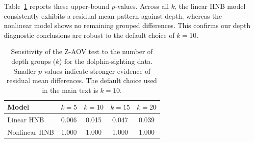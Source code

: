 \documentclass[
  12pt]{article}
\theoremstyle{plain}
\theoremstyle{definition}
\theoremstyle{remark}
\begin{document}
Table~\ref{tab:binning_sensitivity_pbound} reports these upper-bound $p$-values. Across all $k$, the linear HNB model consistently exhibits a residual mean pattern against depth, whereas the nonlinear model shows no remaining grouped differences. This confirms our depth diagnostic conclusions are robust to the default choice of $k=10$.

\begin{table}[!htbp]
\centering
\caption{Sensitivity of the Z-AOV test to the number of depth groups ($k$) for the dolphin-sighting data. Smaller $p$-values indicate stronger evidence of residual mean differences. The default choice used in the main text is $k=10$.}
\label{tab:binning_sensitivity_pbound}
\small
\setlength{\tabcolsep}{5pt}
\renewcommand{\arraystretch}{1.15}
\begin{tabular}{lcccc}
\toprule
Model 
& $k=5$  & $k=10$ & $k=15$ & $k=20$ \\
\midrule
Linear HNB 
& 0.006 & 0.015 & 0.047  & 0.039  \\
Nonlinear HNB 
& 1.000 & 1.000 & 1.000 & 1.000  \\
\bottomrule
\end{tabular}
\end{table}


\clearpage




\end{document}
